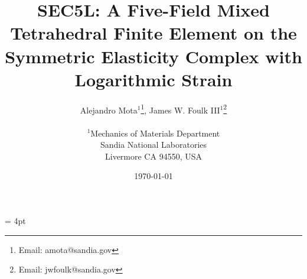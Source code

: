 \documentclass[12pt]{article}
\begin{document}
\setlength{\headheight}{15pt}
\headsep = 4pt
\pagestyle{fancyplain}



\title{
  SEC5L: A Five-Field Mixed Tetrahedral Finite Element on the
  Symmetric Elasticity Complex with Logarithmic Strain}

\author{
  Alejandro Mota$^1$\thanks{Email: amota@sandia.gov},
  James W. Foulk {III}$^1$\thanks{Email: jwfoulk@sandia.gov}\\
  \\
  $^1$Mechanics of Materials Department\\
  Sandia National Laboratories\\
  Livermore CA 94550, USA\\
}

\date{\today}

\maketitle
\end{document}
